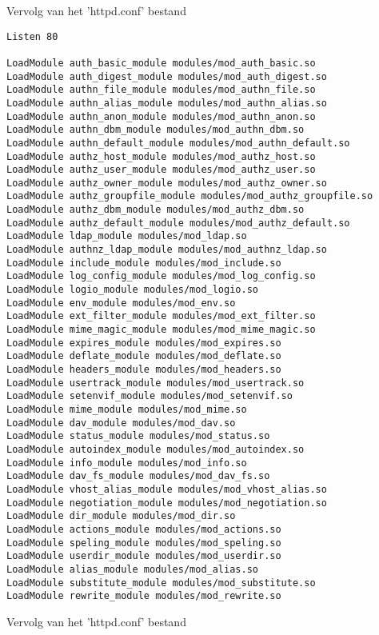 \begin{samepage}
Vervolg van het 'httpd.conf' bestand
\begin{code}
\begin{lstlisting}
Listen 80

LoadModule auth_basic_module modules/mod_auth_basic.so
LoadModule auth_digest_module modules/mod_auth_digest.so
LoadModule authn_file_module modules/mod_authn_file.so
LoadModule authn_alias_module modules/mod_authn_alias.so
LoadModule authn_anon_module modules/mod_authn_anon.so
LoadModule authn_dbm_module modules/mod_authn_dbm.so
LoadModule authn_default_module modules/mod_authn_default.so
LoadModule authz_host_module modules/mod_authz_host.so
LoadModule authz_user_module modules/mod_authz_user.so
LoadModule authz_owner_module modules/mod_authz_owner.so
LoadModule authz_groupfile_module modules/mod_authz_groupfile.so
LoadModule authz_dbm_module modules/mod_authz_dbm.so
LoadModule authz_default_module modules/mod_authz_default.so
LoadModule ldap_module modules/mod_ldap.so
LoadModule authnz_ldap_module modules/mod_authnz_ldap.so
LoadModule include_module modules/mod_include.so
LoadModule log_config_module modules/mod_log_config.so
LoadModule logio_module modules/mod_logio.so
LoadModule env_module modules/mod_env.so
LoadModule ext_filter_module modules/mod_ext_filter.so
LoadModule mime_magic_module modules/mod_mime_magic.so
LoadModule expires_module modules/mod_expires.so
LoadModule deflate_module modules/mod_deflate.so
LoadModule headers_module modules/mod_headers.so
LoadModule usertrack_module modules/mod_usertrack.so
LoadModule setenvif_module modules/mod_setenvif.so
LoadModule mime_module modules/mod_mime.so
LoadModule dav_module modules/mod_dav.so
LoadModule status_module modules/mod_status.so
LoadModule autoindex_module modules/mod_autoindex.so
LoadModule info_module modules/mod_info.so
LoadModule dav_fs_module modules/mod_dav_fs.so
LoadModule vhost_alias_module modules/mod_vhost_alias.so
LoadModule negotiation_module modules/mod_negotiation.so
LoadModule dir_module modules/mod_dir.so
LoadModule actions_module modules/mod_actions.so
LoadModule speling_module modules/mod_speling.so
LoadModule userdir_module modules/mod_userdir.so
LoadModule alias_module modules/mod_alias.so
LoadModule substitute_module modules/mod_substitute.so
LoadModule rewrite_module modules/mod_rewrite.so
\end{lstlisting}
\end{code}
\end{samepage}
Vervolg van het 'httpd.conf' bestand
